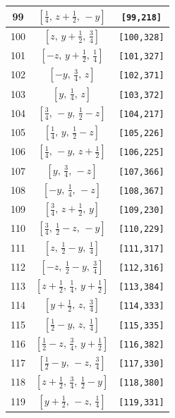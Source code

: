 \documentclass[fleqn,8pt]{jsarticle}
\begin{document}
\begin{longtable}{ccc}
99 & $\left[ \frac{1}{4},\, z + \frac{1}{2},\, - y \right]$ & {\tt [99,218]} \\ \hline
100 & $\left[ z,\, y + \frac{1}{2},\, \frac{3}{4} \right]$ & {\tt [100,328]} \\ \hline
101 & $\left[ - z,\, y + \frac{1}{2},\, \frac{1}{4} \right]$ & {\tt [101,327]} \\ \hline
102 & $\left[ - y,\, \frac{3}{4},\, z \right]$ & {\tt [102,371]} \\ \hline
103 & $\left[ y,\, \frac{1}{4},\, z \right]$ & {\tt [103,372]} \\ \hline
104 & $\left[ \frac{3}{4},\, - y,\, \frac{1}{2} - z \right]$ & {\tt [104,217]} \\ \hline
105 & $\left[ \frac{1}{4},\, y,\, \frac{1}{2} - z \right]$ & {\tt [105,226]} \\ \hline
106 & $\left[ \frac{1}{4},\, - y,\, z + \frac{1}{2} \right]$ & {\tt [106,225]} \\ \hline
107 & $\left[ y,\, \frac{3}{4},\, - z \right]$ & {\tt [107,366]} \\ \hline
108 & $\left[ - y,\, \frac{1}{4},\, - z \right]$ & {\tt [108,367]} \\ \hline
109 & $\left[ \frac{3}{4},\, z + \frac{1}{2},\, y \right]$ & {\tt [109,230]} \\ \hline
110 & $\left[ \frac{3}{4},\, \frac{1}{2} - z,\, - y \right]$ & {\tt [110,229]} \\ \hline
111 & $\left[ z,\, \frac{1}{2} - y,\, \frac{1}{4} \right]$ & {\tt [111,317]} \\ \hline
112 & $\left[ - z,\, \frac{1}{2} - y,\, \frac{3}{4} \right]$ & {\tt [112,316]} \\ \hline
113 & $\left[ z + \frac{1}{2},\, \frac{1}{4},\, y + \frac{1}{2} \right]$ & {\tt [113,384]} \\ \hline
114 & $\left[ y + \frac{1}{2},\, z,\, \frac{3}{4} \right]$ & {\tt [114,333]} \\ \hline
115 & $\left[ \frac{1}{2} - y,\, z,\, \frac{1}{4} \right]$ & {\tt [115,335]} \\ \hline
116 & $\left[ \frac{1}{2} - z,\, \frac{3}{4},\, y + \frac{1}{2} \right]$ & {\tt [116,382]} \\ \hline
117 & $\left[ \frac{1}{2} - y,\, - z,\, \frac{3}{4} \right]$ & {\tt [117,330]} \\ \hline
118 & $\left[ z + \frac{1}{2},\, \frac{3}{4},\, \frac{1}{2} - y \right]$ & {\tt [118,380]} \\ \hline
119 & $\left[ y + \frac{1}{2},\, - z,\, \frac{1}{4} \right]$ & {\tt [119,331]} \\ \hline

\end{longtable}
\end{document}
